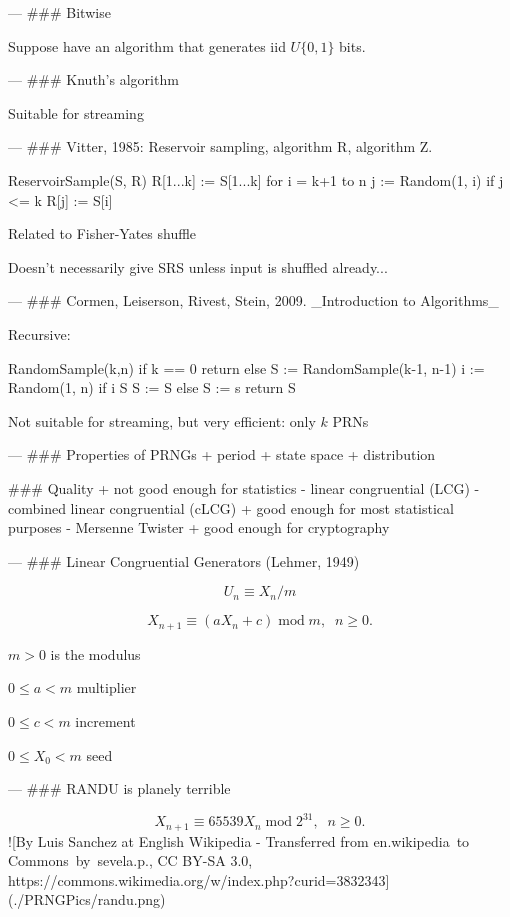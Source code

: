 \documentclass[fleqn]{beamer}
\theoremstyle{plain}
\begin{document}
---
### Bitwise

Suppose have an algorithm that generates iid $U\{0, 1\}$ bits.



---
### Knuth's algorithm

Suitable for streaming

---
### Vitter, 1985: Reservoir sampling, algorithm R, algorithm Z. 

    ReservoirSample(S, R)
    R[1...k] :=  S[1...k]
    for i = k+1 to n
        j := Random(1, i)   
        if j <= k
            R[j] := S[i]

Related to Fisher-Yates shuffle

Doesn't necessarily give SRS unless input is shuffled already...

---
### Cormen, Leiserson, Rivest, Stein, 2009. _Introduction to Algorithms_

Recursive:

    RandomSample(k,n)
    if k == 0
        return {}
    else S := RandomSample(k-1, n-1)
        i := Random(1, n)
        if i \in S
            S := S 
        else S := s 
        return S
    
Not suitable for streaming, but very efficient: only $k$ PRNs

---
### Properties of PRNGs
+ period
+ state space
+ distribution

### Quality
+ not good enough for statistics
    - linear congruential (LCG)
    - combined linear congruential (cLCG)
+ good enough for most statistical purposes
    - Mersenne Twister
+ good enough for cryptography

---
### Linear Congruential Generators (Lehmer, 1949)

$$U_n \equiv X_n/m$$

$$ X_{n+1} \equiv (a X_n + c)\; \mathrm{mod} \; m, \;\; n \ge 0.$$

$ m > 0$ is the modulus

$ 0 \le a < m$ multiplier

$0 \le c < m$ increment

$0 \le X_0 < m$ seed

---
### RANDU is planely terrible

$$ X_{n+1} \equiv 65539 X_n\; \mathrm{mod} \; 2^{31}, \;\; n \ge 0.$$
![By Luis Sanchez at English Wikipedia - Transferred from en.wikipedia to Commons by sevela.p., CC BY-SA 3.0, https://commons.wikimedia.org/w/index.php?curid=3832343](./PRNGPics/randu.png)
\end{document}

